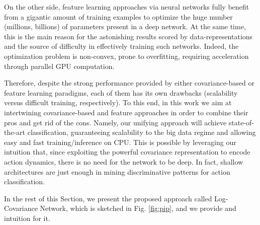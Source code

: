 \documentclass[10pt,twocolumn]{article}
\begin{document}
On the other side, feature learning approaches via neural networks fully benefit from a gigantic amount of training examples to optimize the huge number (millions, billions) of parameters present in a deep network. At the same time, this is the main reason for the astonishing results scored by data-representations and the source of difficulty in effectively training such networks. Indeed, the optimization problem is non-convex, prone to overfitting, requiring acceleration through parallel GPU computation. 



Therefore, despite the strong performance provided by either covariance-based or feature learning paradigms, each of them has its own drawbacks (scalability versus difficult training, respectively). To this end, in this work we aim at intertwining covariance-based and feature approaches in order to combine their pros and get rid of the cons. Namely, our unifying approach will achieve state-of-the-art classification, guaranteeing scalability to the big data regime and allowing easy and fast training/inference on CPU. This is possible by leveraging our intuition that, since exploiting the powerful covariance representation to encode action dynamics, there is no need for the network to be deep. In fact, shallow architectures are just enough in mining discriminative patterns for action classification. 

In the rest of this Section, we present the proposed approach called Log-Covariance Network, which is sketched in Fig. \ref{fig:pip}, and we provide and intuition for it.
\end{document}

